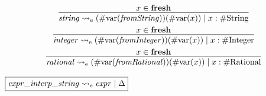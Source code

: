 \begin{gather*}
    \infer{\mathit{string} \rightsquigarrow_\mathrm{e} (\mathrm{\#var}(\mathit{fromString}))(\mathrm{\#var}(x)) \mid x: \mathrm{\#String}}{
        x \in \mathbf{fresh}
    }
    \\
    \infer{\mathit{integer} \rightsquigarrow_\mathrm{e} (\mathrm{\#var}(\mathit{fromInteger}))(\mathrm{\#var}(x)) \mid x: \mathrm{\#Integer}}{
        x \in \mathbf{fresh}
    }
    \\
    \infer{\mathit{rational} \rightsquigarrow_\mathrm{e} (\mathrm{\#var}(\mathit{fromRational}))(\mathrm{\#var}(x)) \mid x: \mathrm{\#Rational}}{
        x \in \mathbf{fresh}
    }
\end{gather*}

$\fbox{$\mathit{expr\_interp\_string} \rightsquigarrow_\mathrm{e} \mathit{expr} \mid \Delta$}$


